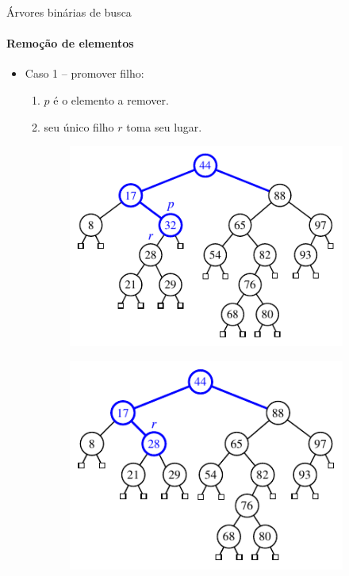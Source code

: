 \begin{frame}{Árvores binárias de busca}
\framesubtitle{Remoção de elementos}
\begin{itemize}
	\item Caso 1 -- promover filho:
	\begin{enumerate}
		\item $p$ é o elemento a remover.
		\item seu único filho $r$ toma seu lugar.
	\end{enumerate}
\end{itemize}

\begin{figure}
	\centering
	\begin{subfigure}
		\centering
		\includegraphics[width=.4\linewidth]{img/figure-11-5a}
	\end{subfigure}%
	\hspace{10pt}
	\begin{subfigure}
		\centering
		\includegraphics[width=.39\linewidth]{img/figure-11-5b}
	\end{subfigure}
\end{figure}
\end{frame}



